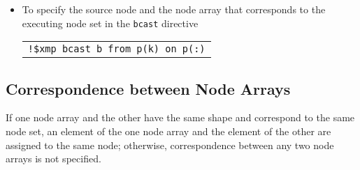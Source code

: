 \begin{itemize}
\item To specify the source node and the node array that corresponds to
      the executing node set in the {\tt bcast} directive 


\begin{tabular}{l}
\verb|!$xmp bcast b from p(k) on p(:)| \\
\end{tabular}
\end{itemize}

%


\subsection{Correspondence between Node Arrays}

If one node array and the other have the same shape and correspond to
the same node set, an element of the one node array and the element of
the other are assigned to the same node;
%
otherwise, correspondence between any two node arrays is not specified.
